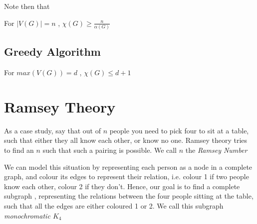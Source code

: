 \documentclass[english,course]{Notes}
\newcommand{\ita}[1]{\textit{#1}}
\begin{document}
\par{Note then that

\begin{theorem}{For $|V(G)| = n$ , $\chi(G) \geq \frac{n}{\alpha(G)}$}\end{theorem}
\proofs{}


\subsection{Greedy Algorithm}

\begin{lemma}{For $max(V(G)) = d$ , $\chi(G) \leq d + 1$}\end{lemma}

\proofs{}

\section{Ramsey Theory}

\par{As a case study, say that out of $n$ people you need to pick four to sit at a table, such that either they all know each other, or know no one. Ramsey theory tries to find an $n$ such that such a pairing is possible. We call $n$ the \ita{Ramsey Number}}

\par{We can model this situation by representing each person as a node in a complete graph, and colour its edges to represent their relation, i.e. colour 1 if two people know each other, colour 2 if they don't. Hence, our goal is to find a complete subgraph , representing the relations between the four people sitting at the table, such that all the edges are either coloured 1 or 2. We call this subgraph \ita{monochromatic $K_{4}$}





}}
\end{document}
